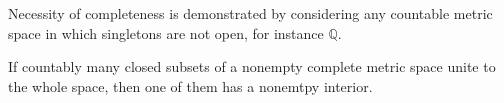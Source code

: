 	\begin{rmk}
		Necessity of completeness is demonstrated by considering any countable metric space in which singletons are not open, for instance $\mathbb Q$.
	\end{rmk}
	
	\begin{cor}
		If countably many closed subsets of a nonempty complete metric space unite to the whole space, then one of them has a nonemtpy interior.
	\end{cor}